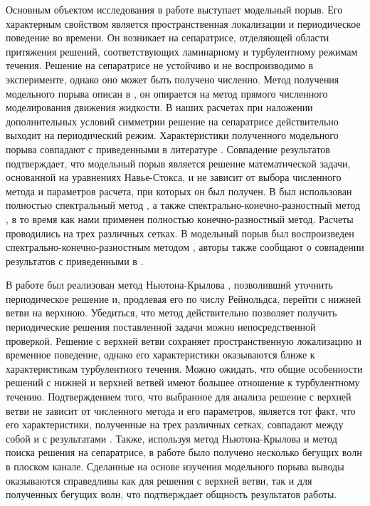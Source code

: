 Основным объектом исследования в работе выступает модельный порыв. Его характерным свойством является пространственная локализации и периодическое поведение во времени. Он возникает на сепаратрисе, отделяющей области притяжения решений, соответствующих ламинарному и турбулентному режимам течения. Решение на сепаратрисе не устойчиво и не воспроизводимо в эксперименте, однако оно может быть получено численно. Метод получения модельного порыва описан в \cite{Avila2013}, он опирается на метод прямого численного моделирования движения жидкости. В наших расчетах при наложении дополнительных условий симметрии \cite{Avila2013} решение на сепаратрисе действительно выходит на периодический режим. Характеристики полученного модельного порыва совпадают с приведенными в литературе \cite{Avila2013, Chantry2014}. Совпадение результатов подтверждает, что модельный порыв является решение математической задачи, основанной на уравнениях Навье-Стокса, и не зависит от выбора численного метода и параметров расчета, при которых он был получен. В \cite{Avila2013} был использован полностью спектральный метод \cite{Meseguer2007}, а также спектрально-конечно-разностный метод \cite{Willis2009}, в то время как нами применен полностью конечно-разностный метод. Расчеты проводились на трех различных сетках. В \cite{Chantry2014} модельный порыв был воспроизведен спектрально-конечно-разностным методом \cite{Willis2009}, авторы также сообщают о совпадении результатов с приведенными в \cite{Avila2013}. 

В работе был реализован метод Ньютона-Крылова \cite{Viswanath2007, Dijkstra2014}, позволивший уточнить периодическое решение и, продлевая его по числу Рейнольдса, перейти с нижней ветви на верхнюю. Убедиться, что метод действительно позволяет получить периодические решения поставленной задачи можно непосредственной проверкой. Решение с верхней ветви сохраняет пространственную локализацию и временное поведение, однако его характеристики оказываются ближе к характеристикам турбулентного течения. Можно ожидать, что общие особенности решений с нижней и верхней ветвей имеют большее отношение к турбулентному течению. Подтверждением того, что выбранное для анализа решение с верхней ветви не зависит от численного метода и его параметров, является тот факт, что его характеристики, полученные на трех различных сетках, совпадают между собой и с результатами \cite{Avila2013}. Также, используя метод Ньютона-Крылова и метод поиска решения на сепаратрисе, в работе было получено несколько бегущих волн в плоском канале. Сделанные на основе изучения модельного порыва выводы оказываются справедливы как для решения с верхней ветви, так и для полученных бегущих волн, что подтверждает общность результатов работы. 


